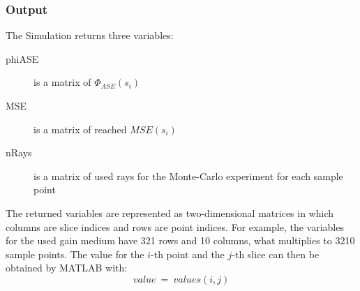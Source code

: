 \subsubsection{Output}
The Simulation returns three variables:
\begin{description}
  \item[phiASE] is a matrix of $\Phi_{ASE}(s_i)$ 
  \item[MSE] is a matrix of reached $MSE(s_i)$
  \item[nRays] is a matrix of used rays for the Monte-Carlo experiment for each sample point
    
\end{description}
The returned variables are represented as two-dimensional matrices in 
which columns are slice indices and rows are point indices.
For example, the variables for the used gain
medium have 321 rows and 10 columns, what multiplies to
3210 sample points. The value for the $i$-th point and
the $j$-th slice can then be obtained by MATLAB with:
\[value~=~values(i,j)\]

